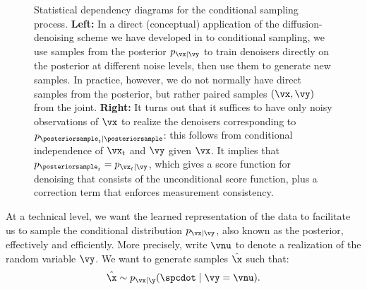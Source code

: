 \documentclass[../../book-main.tex]{subfiles}
\begin{document}
\begin{figure}[t]
  \centering
  \begin{subfigure}{0.45\textwidth}
    \vspace{0.75cm}
    \centering
    \vspace{0.75cm}
    \caption{}
    \label{fig:left}
  \end{subfigure}
  \hfill
  \begin{subfigure}{0.45\textwidth}
    \centering
    \caption{}
    \label{fig:right}
  \end{subfigure}
  \caption{Statistical dependency diagrams for the conditional sampling process.
  \textbf{Left:} In a direct (conceptual) application of the diffusion-denoising scheme
  we have developed in  to conditional sampling, we use
  samples from the posterior $p_{\vx \mid \vy}$ to train denoisers directly on
  the posterior at different noise levels, then use them to generate new
  samples. In practice, however, we do not normally have direct samples from the
  posterior, but rather paired samples $(\vx, \vy)$ from the joint.
  \textbf{Right:} It turns out that it suffices to have only noisy observations
  of $\vx$ to realize the denoisers corresponding to $p_{\posteriorsample_t \mid
  \posteriorsample}$: this follows from conditional independence of $\vx_t$ and
  $\vy$ given $\vx$. It implies that $p_{\posteriorsample_t} = p_{\vx_t \mid
  \vy}$, which gives a score function for denoising that consists of the
  unconditional score function, plus a correction term that enforces measurement
  consistency.}
  \label{fig:posterior-sampling-cds}
\end{figure}


At a technical level, we want the learned representation of the data
to facilitate us to sample the conditional distribution $p_{\vx\mid
\vy}$, also known as the posterior, effectively and efficiently. More precisely,
write $\vnu$ to denote a realization of the random variable $\vy$.
We want to generate samples $\hat{\x}$ such that:
\begin{equation}\label{eq:goal-sample-posterior}
  \hat{\x} \sim   p_{\vx \mid \y}(\spcdot \mid \vy=\vnu).
\end{equation}
\end{document}
